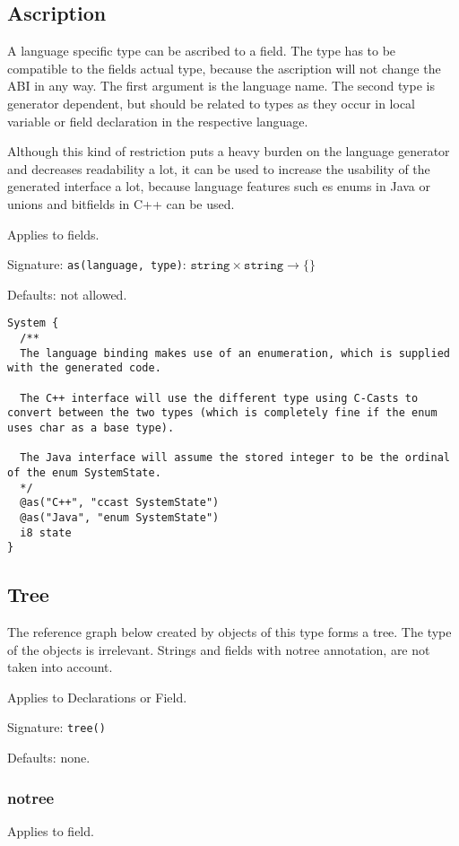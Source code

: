 \documentclass[a4paper,10pt]{article}
\begin{document}
\subsection*{Ascription}
A language specific type can be ascribed to a field. The type has to be compatible to the fields actual type, because the ascription will not change the ABI in any way. The first argument is the language name. The second type is generator dependent, but should be related to types as they occur in local variable or field declaration in the respective language.

Although this kind of restriction puts a heavy burden on the language generator and decreases readability a lot, it can be used to increase the usability of the generated interface a lot, because language features such es enums in Java or unions and bitfields in C++ can be used.

Applies to fields.

Signature: \verb/as(language, type)/: $\texttt{string} \times \texttt{string} → \{\}$

Defaults: not allowed.

\begin{lstlisting}[label=ascriptionExample,caption=Examples,language=skill]
System {
  /**
  The language binding makes use of an enumeration, which is supplied with the generated code.
  
  The C++ interface will use the different type using C-Casts to convert between the two types (which is completely fine if the enum uses char as a base type).
  
  The Java interface will assume the stored integer to be the ordinal of the enum SystemState.
  */
  @as("C++", "ccast SystemState")
  @as("Java", "enum SystemState")
  i8 state
}
\end{lstlisting}



\subsection*{Tree}
The reference graph below created by objects of this type forms a tree. The type of the objects is irrelevant. Strings and fields with notree annotation, are not taken into account.

Applies to Declarations or Field.

Signature: \verb/tree()/

Defaults: none.


\subsubsection*{notree}
Applies to field.
\end{document}
